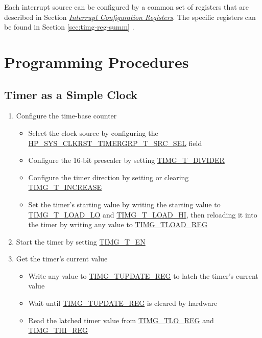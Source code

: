 \documentclass[main\_\_EN.tex]{subfiles}
\begin{document}
Each interrupt source can be configured by a common set of registers that are described in Section \hyperref[interrupt-config-registers]{\textit{Interrupt Configuration Registers}}. The specific registers can be found in Section \ref{sec:timg-reg-summ} \textit{}.


\section{Programming Procedures}
\label{sec:timg-prog-procedures}

\subsection{Timer as a Simple Clock}
\label{sec:timg-func-descr-simple-clock}

\begin{enumerate}
    \item Configure the time-base counter
    \begin{itemize}
        \item Select the clock source by configuring the \hyperref[fielddesc:HPSYSCLKRSTTIMERGRPNTXSRCSEL]{HP\_SYS\_CLKRST\_TIMERGRP\_T\_SRC\_SEL} field
        \item Configure the 16-bit prescaler by setting \hyperref[fielddesc:TIMGTXDIVIDER]{TIMG\_T\_DIVIDER}
        \item Configure the timer direction by setting or clearing \hyperref[fielddesc:TIMGTXINCREASE]{TIMG\_T\_INCREASE}
        \item Set the timer's starting value by writing the starting value to \hyperref[fielddesc:TIMGTXLOADLO]{TIMG\_T\_LOAD\_LO} and \hyperref[fielddesc:TIMGTXLOADHI]{TIMG\_T\_LOAD\_HI}, then reloading it into the timer by writing any value to \hyperref[regdesc:TIMGTXLOADREG]{TIMG\_TLOAD\_REG}
    \end{itemize}
    \item Start the timer by setting \hyperref[fielddesc:TIMGTXEN]{TIMG\_T\_EN}
    \item Get the timer's current value
    \begin{itemize}
        \item  Write any value to \hyperref[regdesc:TIMGTXUPDATEREG]{TIMG\_TUPDATE\_REG} to latch the timer's current value
        \item Wait until \hyperref[regdesc:TIMGTXUPDATEREG]{TIMG\_TUPDATE\_REG} is cleared by hardware
        \item  Read the latched timer value from \hyperref[regdesc:TIMGTXLOREG]{TIMG\_TLO\_REG} and \hyperref[regdesc:TIMGTXHIREG]{TIMG\_THI\_REG}
    \end{itemize}
\end{enumerate}
\end{document}
